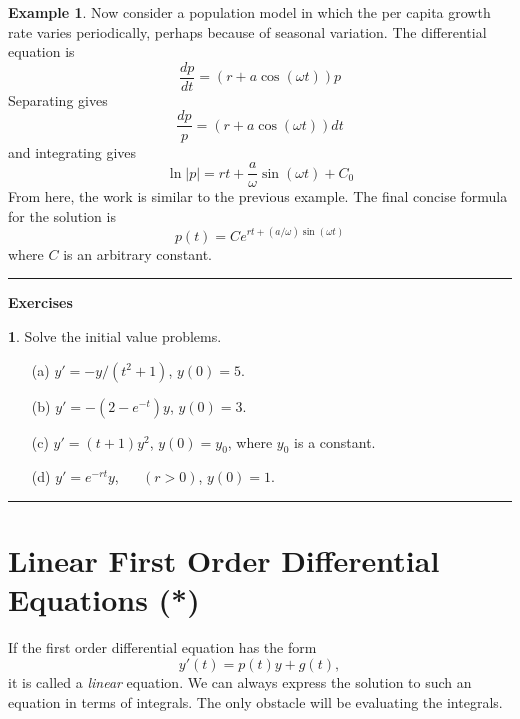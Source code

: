 \documentclass[reqno]{immbook}
\newcommand{\ds}{\displaystyle}
\numberwithin{equation}{chapter}
\numberwithin{question}{section}
\numberwithin{theorem}{chapter}
\numberwithin{figure}{chapter}
\theoremstyle{definition}
\newtheorem{exercise}{}[section]
\newtheorem{example}{Example}[section]
\newenvironment{exercises}%
{%
\medskip\hrule\medskip\noindent\textbf{Exercises}%
}%
{%
\medskip\hrule
}
\begin{document}
\begin{example}
Now consider a population model in which the per capita growth
rate varies periodically, perhaps because of seasonal variation.
The differential equation is
\begin{equation}
   \frac{dp}{dt} = (r + a\cos(\omega t))p
\end{equation}
Separating gives
\begin{equation}
  \frac{dp}{p} = \left( r+a\cos(\omega t) \right) dt
\end{equation}
and integrating gives
\begin{equation}
  \ln | p | = rt + \frac{a}{\omega} \sin(\omega t) + C_0
\end{equation}
From here, the work is similar to the previous example.
The final concise formula for the solution is
\begin{equation}
   p(t) = Ce^{rt + (a/\omega)\sin(\omega t)}
\end{equation}
where $C$ is an arbitrary constant.
\end{example}
%
\begin{exercises}
\begin{exercise}
Solve the initial value problems.
\begin{enumerate}
\item[(a)] $\ds y' = -y/(t^2+1)$, \hspace{0.25cm} $y(0)=5$.
\item[(b)] $\ds y' = -\left(2-e^{-t}\right)y$, \hspace{0.25cm} $y(0)=3$.
\item[(c)] $\ds y' = (t+1)y^2$, \hspace{0.25cm} $y(0)=y_0$, where $y_0$ is
a constant.
\item[(d)] $\ds y' = e^{-rt}y$, ~~ $(r > 0)$, \hspace{0.25cm}
                                       $y(0)=1$.
\end{enumerate}
\end{exercise}
\end{exercises}
%

\newpage

\section{Linear First Order Differential Equations (*)}

If the first order differential equation has the form
\begin{equation}
    y'(t) = p(t) y + g(t),
\label{eqn:linear}
\end{equation}
it is called a \emph{linear} equation.
We can always express the solution to such an equation
in terms of integrals.  The only obstacle will be
evaluating the integrals.
\end{document}
